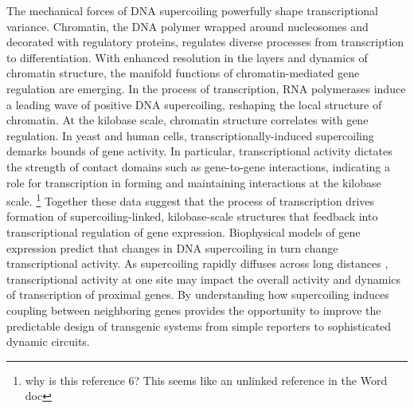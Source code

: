 \documentclass[11pt]{article}
\begin{document}
The mechanical forces of DNA supercoiling powerfully shape transcriptional variance.\parencite{desaiDNArepairPathwayCan2021,chongMechanismTranscriptionalBursting2014}
Chromatin, the DNA polymer wrapped around nucleosomes and decorated with regulatory proteins, regulates diverse processes from transcription to differentiation. With enhanced resolution in the layers and dynamics of chromatin structure, the manifold functions of chromatin-mediated gene regulation are emerging.\parencite{hsiehResolving3DLandscape2020,krietensteinUltrastructuralDetailsMammalian2020}
In the process of transcription, RNA polymerases induce a leading wave of positive DNA supercoiling\parencite{wuTranscriptionGeneratesPositively1988,liuSupercoilingDNATemplate1987}, reshaping the local structure of chromatin.\parencite{acharNegativeSupercoilGene2020,tevesTranscriptiongeneratedTorsionalStress2014a,naughtonTranscriptionFormsRemodels2013,guoHighresolutionGenomewideMapping2021a}
At the kilobase scale, chromatin structure correlates with gene regulation.\parencite{hsiehResolving3DLandscape2020,rowleyEvolutionarilyConservedPrinciples2017}
In yeast and human cells, transcriptionally-induced supercoiling demarks bounds of gene activity.\parencite{acharNegativeSupercoilGene2020,naughtonTranscriptionFormsRemodels2013}
In particular, transcriptional activity dictates the strength of contact domains such as gene-to-gene interactions, indicating a role for transcription in forming and maintaining interactions at the kilobase scale.\parencite{xieMultiInputRNAiBasedLogic2011} \footnote{why is this reference 6? This seems like an unlinked reference in the Word doc}
Together these data suggest that the process of transcription drives formation of supercoiling-linked, kilobase-scale structures that feedback into transcriptional regulation of gene expression. Biophysical models of gene expression predict that changes in DNA supercoiling in turn change transcriptional activity.\parencite{sevierPropertiesGeneExpression2018}
As supercoiling rapidly diffuses across long distances \parencite{loenhoutDynamicsDNASupercoils2012}, transcriptional activity at one site may impact the overall activity and dynamics of transcription of proximal genes.\parencite{sevierCollectivePolymeraseDynamics2022,tripathiDNASupercoilingmediatedCollective2021}
By understanding how supercoiling induces coupling between neighboring genes provides the opportunity to improve the predictable design of transgenic systems from simple reporters to sophisticated dynamic circuits.
\end{document}
